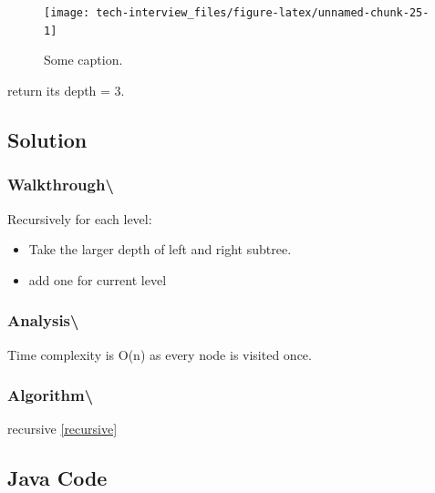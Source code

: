 \documentclass[]{book}
\providecommand{\tightlist}{%
  \setlength{\itemsep}{0pt}\setlength{\parskip}{0pt}}
\begin{document}
\begin{figure}
\texttt{[image: tech-interview\_files/figure-latex/unnamed-chunk-25-1]} \caption{Some caption.}\label{fig:unnamed-chunk-25}
\end{figure}

return its depth = 3.

\hypertarget{solution-44}{%
\subsection{Solution}\label{solution-44}}

\hypertarget{walkthrough-74}{%
\subsubsection{Walkthrough\textbackslash{}}\label{walkthrough-74}}

Recursively for each level:

\begin{itemize}
\tightlist
\item
  Take the larger depth of left and right subtree.
\item
  add one for current level
\end{itemize}

\hypertarget{analysis-81}{%
\subsubsection{Analysis\textbackslash{}}\label{analysis-81}}

Time complexity is O(n) as every node is visited once.

\hypertarget{algorithm-82}{%
\subsubsection{Algorithm\textbackslash{}}\label{algorithm-82}}

recursive \ref{recursive}

\hypertarget{java-code-48}{%
\subsection{Java Code}\label{java-code-48}}
\end{document}

